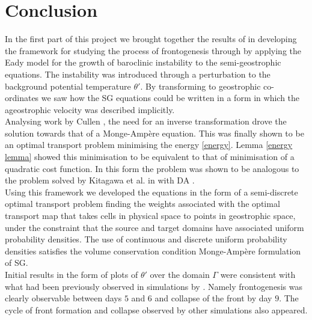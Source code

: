 \chapter*{Conclusion}
In the first part of this project we brought together the results of \cite{Hoskins1975,Shutts1987,Cullen2006a} in developing the framework for studying the process of frontogenesis through by applying the Eady model for the growth of baroclinic instability to the semi-geostrophic equations. The instability was introduced through a perturbation to the background potential temperature $\theta '$. By transforming to geostrophic co-ordinates we saw how the SG equations could be written in a form in which the ageostrophic velocity was described implicitly.
\\
\linebreak
Analysing work by Cullen \cite{Cullen2006a}, the need for an inverse transformation drove the solution towards that of a Monge-Amp\`{e}re equation. This was finally shown to be an optimal transport problem minimising the energy \ref{energy}. Lemma \ref{energy lemma} showed this minimisation to be equivalent to that of minimisation of a quadratic cost function. In this form the problem was shown to be analogous to the problem solved by Kitagawa et al. in \cite{Kitagawa2016} with DA \cite{Merigot2017a}.
\\
\linebreak
Using this framework we developed the equations in the form of a semi-discrete optimal transport problem finding the weights associated with the optimal transport map that takes cells in physical space to points in geostrophic space, under the constraint that the source and target domains have associated uniform probability densities. The use of continuous and discrete uniform probability densities satisfies the volume conservation condition Monge-Amp\`{e}re formulation of SG.
\\
\linebreak
Initial results in the form of plots of $\theta '$ over the domain $\Gamma$ were consistent with what had been previously observed in simulations by \cite{Cullen1993, Nakamura1994}. Namely frontogenesis was clearly observable between days $5$ and $6$ and collapse of the front by day $9$. The cycle of front formation and collapse observed by other simulations also appeared.
\\
\linebreak 
